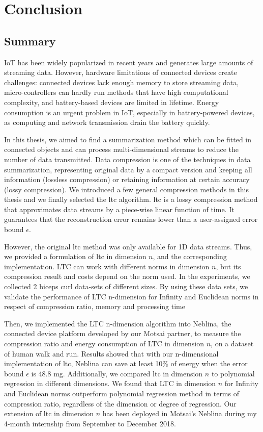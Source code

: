 \chapter{Conclusion}


\section{Summary}


IoT has been widely popularized in recent years and generates large amounts of
streaming data. However, hardware limitations of connected devices create challenges:
connected devices lack enough memory to store streaming data,
micro-controllers can hardly run methods that have high computational
complexity, and battery-based devices are limited in lifetime. Energy consumption is an urgent problem in
IoT, especially in battery-powered devices, as computing and network
transmission drain the battery quickly.

In this thesis, we aimed to find a summarization method which can be fitted
in connected objects and can process multi-dimensional streams to reduce
the number of data transmitted. Data compression is one of the techniques
in data summarization, representing original data by a compact version and
keeping all information (lossless compression) or retaining information at
certain accuracy (lossy compression). We introduced a few general
compression methods in this thesis and we finally selected the
\acrfull{ltc} algorithm. \acrshort{ltc} is a lossy compression method that
approximates data streams by a piece-wise linear function of time. It
guarantees that the reconstruction error remains lower than a user-assigned
error bound $\epsilon$. 

However, the original \acrshort{ltc} method was only available for 1D data
streams. Thus, we provided a formulation of \acrshort{ltc} in dimension $n$, and
the corresponding implementation. LTC can work with different norms in dimension
$n$, but its compression result and costs depend on the norm used. In the
experiments, we collected 2 biceps curl data-sets of different sizes. By using
these data sets, we validate the performance of LTC n-dimension for Infinity and
Euclidean norms in respect of compression ratio, memory and processing time

Then, we implemented the LTC n-dimension algorithm into Neblina, the connected
device platform developed by our Motsai partner, to measure the compression
ratio and energy consumption of LTC in dimension $n$, on a dataset of human walk
and run. Results showed that with our n-dimensional implementation of
\acrshort{ltc}, Neblina can save at least 10\% of energy when the error bound
$\epsilon$ is 48.8 mg. Additionally, we compared \acrshort{ltc} in dimension $n$
to polynomial regression in different dimensions. We found that LTC in dimension
$n$ for Infinity and Euclidean norms outperform polynomial regression method in
terms of compression ratio, regardless of the dimension or degree of regression.
Our extension of \acrshort{ltc} in dimension $n$ has been deployed in Motsai's
Neblina during my 4-month internship from September to December 2018.

